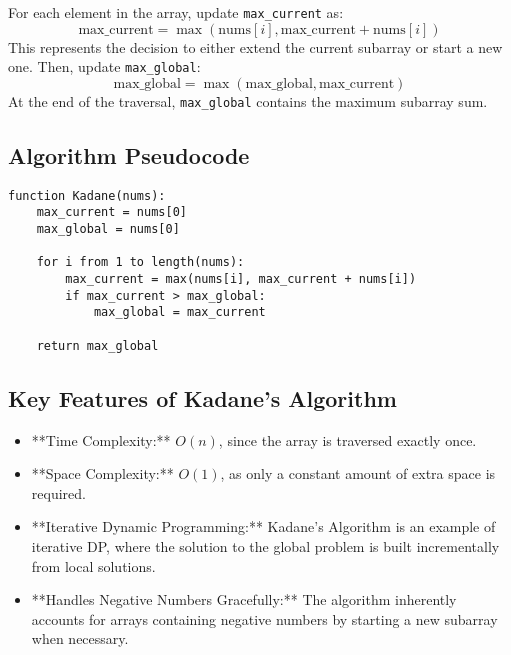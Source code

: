 For each element in the array, update \texttt{max\_current} as:
\[
\text{max\_current} = \max(\text{nums}[i], \text{max\_current} + \text{nums}[i])
\]
This represents the decision to either extend the current subarray or start a new one. Then, update \texttt{max\_global}:
\[
\text{max\_global} = \max(\text{max\_global}, \text{max\_current})
\]
At the end of the traversal, \texttt{max\_global} contains the maximum subarray sum.

\subsection*{Algorithm Pseudocode}
\begin{verbatim}
function Kadane(nums):
    max_current = nums[0]
    max_global = nums[0]

    for i from 1 to length(nums):
        max_current = max(nums[i], max_current + nums[i])
        if max_current > max_global:
            max_global = max_current

    return max_global
\end{verbatim}

\subsection*{Key Features of Kadane's Algorithm}
\begin{itemize}
    \item **Time Complexity:** \(O(n)\), since the array is traversed exactly once.
    \item **Space Complexity:** \(O(1)\), as only a constant amount of extra space is required.
    \item **Iterative Dynamic Programming:** Kadane's Algorithm is an example of iterative DP, where the solution to the global problem is built incrementally from local solutions.
    \item **Handles Negative Numbers Gracefully:** The algorithm inherently accounts for arrays containing negative numbers by starting a new subarray when necessary.
\end{itemize}

